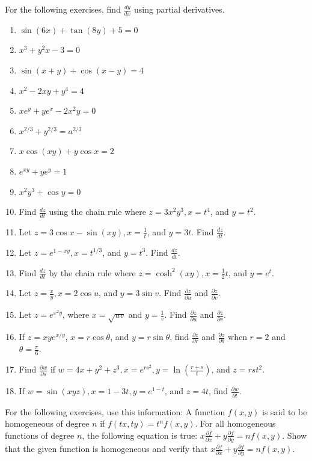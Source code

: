\documentclass{exercises}
\begin{document}
For the following exercises, find $\frac{dy}{dx}$ using partial derivatives.

\begin{enumerate}[resume]
\item $\sin(6x)+\tan(8y)+5=0$
\item $x^{3}+y^{2}x-3=0$
\item $\sin(x+y)+\cos(x-y)=4$
\item $x^{2}-2xy+y^{4}=4$
\item $xe^{y}+ye^{x}-2x^{2}y=0$
\item $x^{2/3}+y^{2/3}=a^{2/3}$
\item $x\cos(xy)+y\cos x=2$
\item $e^{xy}+ye^{y}=1$
\item $x^{2}y^{3}+\cos y=0$
\item Find $\frac{dz}{dt}$ using the chain rule where $z=3x^{2}y^{3},x=t^{4}$, and $y=t^{2}$.
\item Let $z=3\cos x-\sin(xy),x=\frac{1}{t}$, and $y=3t$. Find $\frac{dz}{dt}$.
\item Let $z=e^{1-xy},x=t^{1/3}$, and $y=t^{3}$. Find $\frac{dz}{dt}$.
\item Find $\frac{dz}{dt}$ by the chain rule where $z=\cosh^{2}(xy),x=\frac{1}{2}t$, and $y=e^{t}$.
\item Let $z=\frac{x}{y},x=2\cos u$, and $y=3\sin v$. Find $\frac{\partial z}{\partial u}$ and $\frac{\partial z}{\partial v}$.
\item Let $z=e^{x^{2}y}$, where $x=\sqrt{uv}$ and $y=\frac{1}{v}$. Find $\frac{\partial z}{\partial u}$ and $\frac{\partial z}{\partial v}$.
\item If $z=xye^{x/y}$, $x=r\cos \theta$, and $y=r\sin \theta$, find $\frac{\partial z}{\partial r}$ and $\frac{\partial z}{\partial \theta}$ when $r=2$ and $\theta=\frac{\pi}{6}$.
\item Find $\frac{\partial w}{\partial s}$ if $w=4x+y^{2}+z^{3},x=e^{rs^{2}},y=\ln(\frac{r+s}{t})$, and $z=rst^{2}$.
\item If $w=\sin(xyz),x=1-3t,y=e^{1-t}$, and $z=4t$, find $\frac{\partial w}{\partial t}$.
\end{enumerate}

For the following exercises, use this information: A function $f(x,y)$ is said to be homogeneous of degree $n$ if $f(tx,ty)=t^{n}f(x,y)$. For all homogeneous functions of degree $n$, the following equation is true: $x\frac{\partial f}{\partial x}+y\frac{\partial f}{\partial y}=nf(x,y)$. Show that the given function is homogeneous and verify that $x\frac{\partial f}{\partial x}+y\frac{\partial f}{\partial y}=nf(x,y)$.
\end{document}
